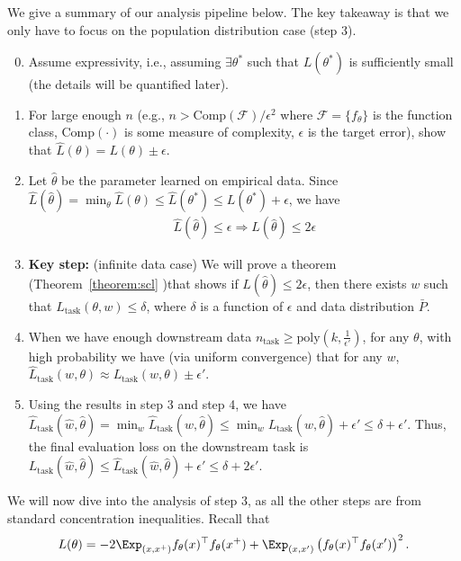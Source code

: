  We give a summary of our analysis pipeline below. The key takeaway is that we only have to focus on the population distribution case (step 3). 
\begin{enumerate}\setcounter{enumi}{-1}
\item{Assume expressivity, i.e., assuming $\exists \theta^*$ such that $L(\theta^*)$ is sufficiently small (the details will be quantified later).}
\item{For large enough $n$ (e.g., $n>\text{Comp}({\mathcal{F}})/\epsilon^2$ where ${\mathcal{F}}=\{f_\theta\}$ is the function class, $\text{Comp}(\cdot)$ is some measure of complexity, $\epsilon$ is the target error), show that $\hat{L}(\theta) = L(\theta) \pm \epsilon$.}
\item{Let $\hat{\theta}$ be the parameter learned on empirical data. Since $\hat{L}(\hat{\theta})=\min_{\theta}\hat{L}(\theta) \le \hat{L}(\theta^*) \le L(\theta^*)+\epsilon$, we have
\begin{align}
	\hat{L}(\hat{\theta})\le\epsilon \Rightarrow L(\hat{\theta}) \le 2\epsilon
\end{align}
}
\item{\textbf{Key step:} (infinite data case) We will prove a theorem (Theorem~\ref{theorem:scl} )that shows if $L(\hat{\theta})\le2\epsilon$, then there exists $w$ such that $L_{\text{task}}(\theta, w)\le \delta$, where $\delta$ is a function of $\epsilon$ and data distribution $\bar{P}$.}
\item{When we have enough downstream data $n_{\text{task}}\ge\text{poly}(k, \frac{1}{\epsilon'})$, for any $\theta$, with high probability we have (via uniform convergence) that for any $w$, 
$	\hat{L}_{\text{task}}(w, \theta) \approx L_{\text{task}}(w, \theta)\pm \epsilon'$. }
\item{Using the results in step 3 and step 4, we have $\hat{L}_{\text{task}}(\hat{w}, \hat{\theta}) = \min_{w} \hat{L}_{\text{task}}(w, \hat{\theta}) \le \min_w L_{\text{task}}(w, \hat{\theta}) + \epsilon' \le \delta + \epsilon'$. Thus, the final evaluation loss on the downstream task is $L_{\text{task}}(\hat{w}, \hat{\theta}) \le \hat{L}_{\text{task}}(\hat{w}, \hat{\theta}) +\epsilon' \le \delta + 2\epsilon'$. }
\end{enumerate}

 We will now dive into the analysis of step 3, as all the other steps are from standard concentration inequalities. Recall that 
\begin{align}
		L(\theta)  = -2\Exp_{(x, x^+) } f_{{\theta}}(x)^\top f_{{\theta}}(x^+) + \Exp_{(x, x') }  \left(f_{{\theta}}(x)^\top f_{{\theta}}(x')\right)^2.
\end{align}

